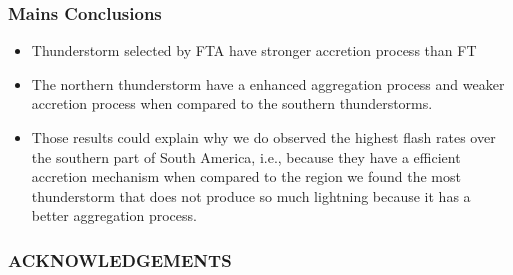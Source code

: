 \documentclass[smaller]{beamer}
\begin{document}
\begin{frame}
\frametitle{Mains Conclusions}
\begin{itemize}
\item Thunderstorm selected by FTA have stronger accretion process than FT
\item The northern thunderstorm have a enhanced aggregation process and weaker accretion process when compared to the southern thunderstorms.
\item Those results could explain why we do observed the highest flash rates over the southern part of South America, i.e., because they have a efficient accretion mechanism when compared to the region we found the most thunderstorm that does not produce so much lightning because it has a better aggregation process.
\end{itemize}

\end{frame}


\begin{frame}
\frametitle{ACKNOWLEDGEMENTS}



\end{frame}
\end{document}
